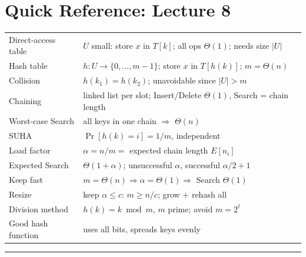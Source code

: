 \documentclass[11pt]{article}
\begin{document}
\section*{\textcolor{violetT}{Quick Reference: Lecture 8}}
\begin{keybox}
\renewcommand{\arraystretch}{1.4}
\begin{tabular}{l l}
Direct-access table & $U$ small: store $x$ in $T[k]$; all ops \textcolor{greenO}{$\Theta(1)$}; needs size $|U|$\\
Hash table & $h : U \to \{0,\ldots,m-1\}$; store $x$ in $T[h(k)]$; $m = \Theta(n)$\\
Collision & $h(k_1)=h(k_2)$; unavoidable since $|U| > m$\\
Chaining & linked list per slot; Insert/Delete \textcolor{greenO}{$\Theta(1)$}, Search = chain length\\
Worst-case Search & all keys in one chain $\Rightarrow$ \textcolor{rustW}{$\Theta(n)$}\\
SUHA & $\Pr[h(k)=i] = 1/m$, independent\\
Load factor & $\alpha = n/m = $ expected chain length $E[n_i]$\\
Expected Search & \textcolor{greenO}{$\Theta(1+\alpha)$}; unsuccessful $\alpha$, successful $\alpha/2 + 1$\\
Keep fast & $m = \Theta(n) \Rightarrow \alpha = \Theta(1) \Rightarrow$ Search \textcolor{greenO}{$\Theta(1)$}\\
Resize & keep $\alpha \le c$: $m \ge n/c$; grow $+$ rehash all\\
Division method & $h(k) = k \bmod m$, $m$ prime; avoid $m = 2^{\ell}$\\
Good hash function & uses all bits, spreads keys evenly\\
\end{tabular}
\end{keybox}

\vspace{4pt}
\begin{center}\textcolor{greyline}{\rule{0.5\linewidth}{0.6pt}}\end{center}

\newpage

\end{document}
